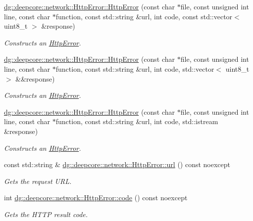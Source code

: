 \begin{DoxyCompactItemize}
\hyperlink{group___network_module_ga03929fda967c6a3609d28953ac0fad55}{dg\+::deepcore\+::network\+::\+Http\+Error\+::\+Http\+Error} (const char $\ast$file, const unsigned int line, const char $\ast$function, const std\+::string \&url, int code, const std\+::vector$<$ uint8\+\_\+t $>$ \&response)
\begin{DoxyCompactList}\small\item\em Constructs an \hyperlink{classdg_1_1deepcore_1_1network_1_1_http_error}{Http\+Error}. \end{DoxyCompactList}\item 
\hyperlink{group___network_module_gaacf30b407e830bcfc3a15b14c6bcda3f}{dg\+::deepcore\+::network\+::\+Http\+Error\+::\+Http\+Error} (const char $\ast$file, const unsigned int line, const char $\ast$function, const std\+::string \&url, int code, std\+::vector$<$ uint8\+\_\+t $>$ \&\&response)
\begin{DoxyCompactList}\small\item\em Constructs an \hyperlink{classdg_1_1deepcore_1_1network_1_1_http_error}{Http\+Error}. \end{DoxyCompactList}\item 
\hyperlink{group___network_module_ga45854282cc688af939cbe7d7242661a3}{dg\+::deepcore\+::network\+::\+Http\+Error\+::\+Http\+Error} (const char $\ast$file, const unsigned int line, const char $\ast$function, const std\+::string \&url, int code, std\+::istream \&response)
\begin{DoxyCompactList}\small\item\em Constructs an \hyperlink{classdg_1_1deepcore_1_1network_1_1_http_error}{Http\+Error}. \end{DoxyCompactList}\item 
const std\+::string \& \hyperlink{group___network_module_ga979dcee6ab51c4f6be456ae242c8f90b}{dg\+::deepcore\+::network\+::\+Http\+Error\+::url} () const noexcept
\begin{DoxyCompactList}\small\item\em Gets the request U\+RL. \end{DoxyCompactList}\item 
int \hyperlink{group___network_module_ga7dcace94fa3fc37b1f0f6881438c6446}{dg\+::deepcore\+::network\+::\+Http\+Error\+::code} () const noexcept
\begin{DoxyCompactList}\small\item\em Gets the H\+T\+TP result code. \end{DoxyCompactList}\item 

\end{DoxyCompactItemize}
